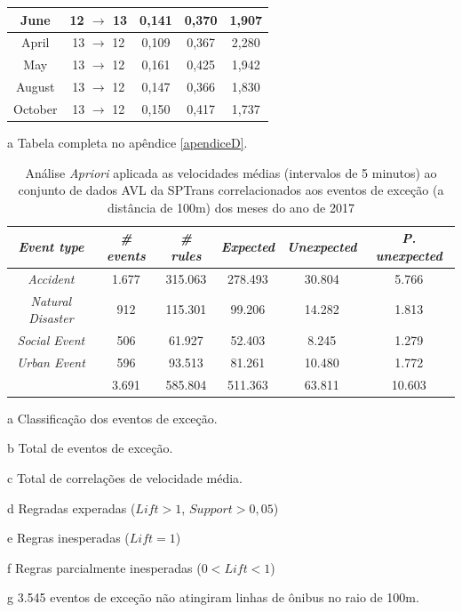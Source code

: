 \documentclass[
	12pt,				%
	oneside,			%
	a4paper,			%
	english,			%
	brazil				%
	]{abntex2ppgsi}
\begin{document}
\begin{table}[!htb]
\begin{threeparttable}
\begin{tabular}{c|c|c|c|c}
June & 12 $\rightarrow$ 13 & 0,141 & 0,370 & 1,907\\
\hline
\hline
April  & 13 $\rightarrow$ 12 & 0,109 & 0,367 & 2,280\\
May & 13 $\rightarrow$ 12 & 0,161 & 0,425 & 1,942\\
August & 13 $\rightarrow$ 12 & 0,147 & 0,366 & 1,830\\
October & 13 $\rightarrow$ 12 & 0,150 & 0,417 & 1,737\\
\hline
\end{tabular}
\begin{tablenotes}
            \item[a] Tabela completa no apêndice \ref{apendiceD}.
        \end{tablenotes}
\end{threeparttable}
\end{table}

\begin{table}[!htb]
\centering
\begin{threeparttable}
\caption {Análise \textit{Apriori} aplicada as velocidades médias (intervalos de 5 minutos) ao conjunto de dados AVL da SPTrans correlacionados aos eventos de exceção (a distância de 100m) dos meses do ano de 2017}
\label {tab:aprioriFull}
\begin{tabular}{c|c|c|c|c|c}
\toprule
\textbf{\textit{Event type}}\tnote{a} & \textbf{\textit{\# events}}\tnote{b} & \textit{\textbf{\# rules}}\tnote{c} & \textbf{\textit{Expected}}\tnote{d} & \textbf{\textit{Unexpected}}\tnote{e} & \textbf{\textit{P. unexpected}}\tnote{f}   \\
\midrule
\textit{Accident} & 1.677 & 315.063 & 278.493 & 30.804 & 5.766 \\
\hline
\textit{Natural Disaster} & 912 & 115.301 & 99.206 & 14.282 & 1.813 \\
\hline
\textit{Social Event} & 506 & 61.927 & 52.403 & 8.245 & 1.279 \\
\hline
\textit{Urban Event} & 596 & 93.513 & 81.261 & 10.480 & 1.772 \\
\midrule
{} & 3.691 & 585.804 & 511.363 & 63.811 & 10.603 \\
\bottomrule
\end{tabular}
\begin{tablenotes}
            \item[a] Classificação dos eventos de exceção.
            \item[b] Total de eventos de exceção.
            \item[c] Total de correlações de velocidade média.
            \item[d] Regradas experadas ($Lift > 1$, $Support > 0,05$)
            \item[e] Regras inesperadas ($Lift = 1$)
            \item[f] Regras parcialmente inesperadas ($0 < Lift < 1$)
            \item[g] 3.545 eventos de exceção não atingiram linhas de ônibus no raio de 100m.
        \end{tablenotes}
\end{threeparttable}
\end{table}
\end{document}
